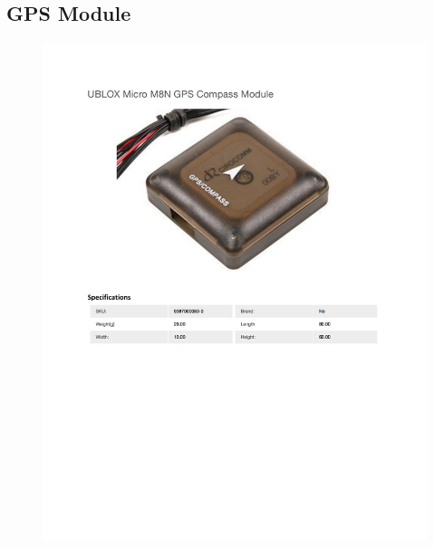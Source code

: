 \documentclass[../main.tex]{subfiles}
\begin{document}
\subsection{GPS Module \cite{GPSModule}} \label{GPSModule}
\begin{figure}[H]
	\centering
	\includegraphics[width=\textwidth]{img/specs/gps.pdf}
\end{figure}

\end{document}
